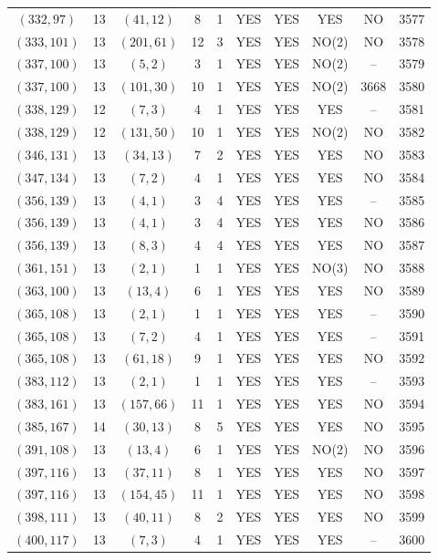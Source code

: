\begin{longtable}{|c|c|c|c|c|c|c|c|c|c|}
$(332, 97)$ & 13 & $(41, 12)$ & 8 & 1 & YES & YES & YES & NO & 3577\\
$(333, 101)$ & 13 & $(201, 61)$ & 12 & 3 & YES & YES & NO(2) & NO & 3578\\
$(337, 100)$ & 13 & $(5, 2)$ & 3 & 1 & YES & YES & NO(2) & -- & 3579\\
$(337, 100)$ & 13 & $(101, 30)$ & 10 & 1 & YES & YES & NO(2) & 3668 & 3580\\
$(338, 129)$ & 12 & $(7, 3)$ & 4 & 1 & YES & YES & YES & -- & 3581\\
$(338, 129)$ & 12 & $(131, 50)$ & 10 & 1 & YES & YES & NO(2) & NO & 3582\\
$(346, 131)$ & 13 & $(34, 13)$ & 7 & 2 & YES & YES & YES & NO & 3583\\
$(347, 134)$ & 13 & $(7, 2)$ & 4 & 1 & YES & YES & YES & NO & 3584\\
$(356, 139)$ & 13 & $(4, 1)$ & 3 & 4 & YES & YES & YES & -- & 3585\\
$(356, 139)$ & 13 & $(4, 1)$ & 3 & 4 & YES & YES & YES & NO & 3586\\
$(356, 139)$ & 13 & $(8, 3)$ & 4 & 4 & YES & YES & YES & NO & 3587\\
$(361, 151)$ & 13 & $(2, 1)$ & 1 & 1 & YES & YES & NO(3) & NO & 3588\\
$(363, 100)$ & 13 & $(13, 4)$ & 6 & 1 & YES & YES & YES & NO & 3589\\
$(365, 108)$ & 13 & $(2, 1)$ & 1 & 1 & YES & YES & YES & -- & 3590\\
$(365, 108)$ & 13 & $(7, 2)$ & 4 & 1 & YES & YES & YES & -- & 3591\\
$(365, 108)$ & 13 & $(61, 18)$ & 9 & 1 & YES & YES & YES & NO & 3592\\
$(383, 112)$ & 13 & $(2, 1)$ & 1 & 1 & YES & YES & YES & -- & 3593\\
$(383, 161)$ & 13 & $(157, 66)$ & 11 & 1 & YES & YES & YES & NO & 3594\\
$(385, 167)$ & 14 & $(30, 13)$ & 8 & 5 & YES & YES & YES & NO & 3595\\
$(391, 108)$ & 13 & $(13, 4)$ & 6 & 1 & YES & YES & NO(2) & NO & 3596\\
$(397, 116)$ & 13 & $(37, 11)$ & 8 & 1 & YES & YES & YES & NO & 3597\\
$(397, 116)$ & 13 & $(154, 45)$ & 11 & 1 & YES & YES & YES & NO & 3598\\
$(398, 111)$ & 13 & $(40, 11)$ & 8 & 2 & YES & YES & YES & NO & 3599\\
$(400, 117)$ & 13 & $(7, 3)$ & 4 & 1 & YES & YES & YES & -- & 3600\\

\end{longtable}
